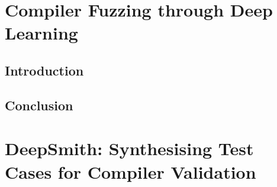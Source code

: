 \ifstapled
\chapter{Compiler Fuzzing through Deep Learning}
\section{Introduction}
\lipsum[1-2]

\section{Conclusion}
\lipsum[1-2]
\else
\chapter{DeepSmith: Synthesising Test Cases for Compiler Validation}
\label{chap:deepsmith}






\fi
